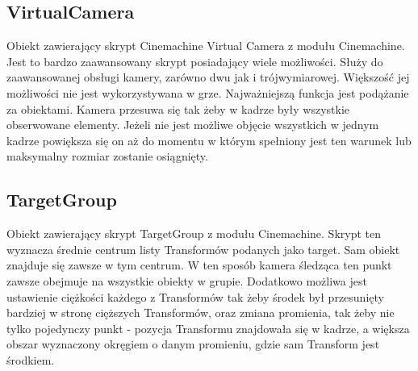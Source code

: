 \documentclass[a4paper,12pt,twoside,openany]{report}
\begin{document}
\subsection{VirtualCamera}
\label{virtualcamera}
Obiekt zawierający skrypt Cinemachine Virtual Camera z modułu Cinemachine. Jest to bardzo  zaawansowany skrypt posiadający wiele możliwości. Służy do zaawansowanej obsługi kamery, zarówno dwu jak i trójwymiarowej. Większość jej możliwości nie jest wykorzystywana w grze. Najważniejszą funkcja jest podążanie za obiektami. Kamera przesuwa się tak żeby w kadrze były wszystkie obserwowane elementy. Jeżeli nie jest możliwe objęcie wszystkich w jednym kadrze powiększa się on aż do momentu w którym spełniony jest ten warunek lub maksymalny rozmiar zostanie osiągnięty. 

\subsection{TargetGroup}
\label{targetgroup}
Obiekt zawierający skrypt TargetGroup z modułu Cinemachine. Skrypt ten wyznacza średnie centrum listy Transformów podanych jako target. Sam obiekt znajduje się zawsze w tym centrum. W ten sposób kamera śledząca ten punkt zawsze obejmuje na wszystkie obiekty w grupie. Dodatkowo możliwa jest ustawienie ciężkości każdego z Transformów tak żeby środek był przesunięty bardziej w stronę cięższych Transformów, oraz zmiana promienia, tak żeby nie tylko pojedynczy punkt - pozycja Transformu znajdowała się w kadrze, a większa obszar wyznaczony okręgiem o danym promieniu, gdzie sam Transform jest środkiem.
\end{document}
